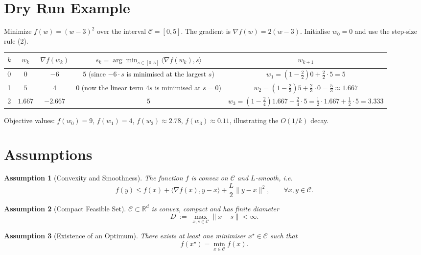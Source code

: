 \documentclass{article}
\newtheorem{assumption}{Assumption}
\newcommand{\R}{\mathbb{R}}
\newcommand{\Cset}{\mathcal{C}}
\newcommand{\opt}{x^{\star}}
\newcommand{\grad}{\nabla}
\newcommand{\inner}[2]{\langle #1,#2\rangle}
\newcommand{\norm}[1]{\|#1\|}
\begin{document}
\section*{Dry Run Example}
Minimize $f(w)=(w-3)^{2}$ over the interval $\Cset=[0,5]$.  
The gradient is $\grad f(w)=2(w-3)$.  Initialise $w_{0}=0$ and use the step‑size rule (2).

\begin{center}
\begin{tabular}{c|c|c|c|c}
$k$ & $w_{k}$ & $\grad f(w_{k})$ & $s_{k}=\arg\min_{s\in[0,5]}\inner{\grad f(w_{k})}{s}$ & $w_{k+1}$ \\ \hline
0 & $0$ & $-6$ & $5$ (since $-6\cdot s$ is minimised at the largest $s$) & $w_{1}= (1-\tfrac{2}{2})0+\tfrac{2}{2}\cdot5 =5$ \\[4pt]
1 & $5$ & $4$ & $0$ (now the linear term $4s$ is minimised at $s=0$) & $w_{2}= (1-\tfrac{2}{3})5+\tfrac{2}{3}\cdot0 =\tfrac{5}{3}\approx1.667$ \\[4pt]
2 & $1.667$ & $-2.667$ & $5$ & $w_{3}= (1-\tfrac{2}{4})1.667+\tfrac{2}{4}\cdot5 =\tfrac{1}{2}\cdot1.667+ \tfrac{1}{2}\cdot5 =3.333$ \\[4pt]
\end{tabular}
\end{center}
Objective values: $f(w_{0})=9$, $f(w_{1})=4$, $f(w_{2})\approx2.78$, $f(w_{3})\approx0.11$, illustrating the $O(1/k)$ decay.

\newpage
\section*{Assumptions}
\begin{assumption}[Convexity and Smoothness]\label{ass:convex}
The function $f$ is convex on $\Cset$ and $L$‑smooth, i.e.
\[
f(y)\le f(x)+\inner{\grad f(x)}{y-x}+\frac{L}{2}\norm{y-x}^{2},
\qquad\forall x,y\in\Cset .
\tag{A1}
\]
\end{assumption}
\begin{assumption}[Compact Feasible Set]\label{ass:compact}
$\Cset\subset\R^{d}$ is convex, compact and has finite diameter
\[
D \;:=\; \max_{x,s\in\Cset}\norm{x-s}<\infty .
\tag{A2}
\]
\end{assumption}
\begin{assumption}[Existence of an Optimum]\label{ass:opt}
There exists at least one minimiser $\opt\in\Cset$ such that
\[
f(\opt)=\min_{x\in\Cset}f(x).
\tag{A3}
\]
\end{assumption}
\end{document}
